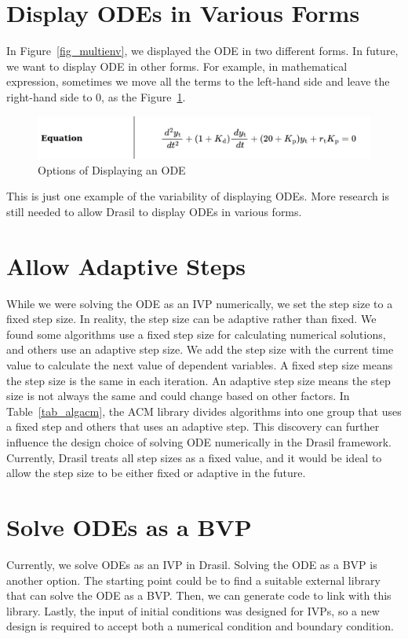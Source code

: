 \section{Display ODEs in Various Forms}
In Figure~\ref{fig_multienv}, we displayed the ODE in two different forms. In future, we want to display ODE in other forms. For example, in mathematical expression, sometimes we move all the terms to the left-hand side and leave the right-hand side to 0, as the Figure~\ref{fig_odevariousform}.
\begin{figure}[ht]
\centering	
\includegraphics[width=1\textwidth]{figures/ODEVariousForm.png}
\caption{Options of Displaying an ODE}
\label{fig_odevariousform}
\end{figure}
This is just one example of the variability of displaying ODEs. More research is still needed to allow Drasil to display ODEs in various forms.

\section{Allow Adaptive Steps}
While we were solving the ODE as an IVP numerically, we set the step size to a fixed step size. In reality, the step size can be adaptive rather than fixed. We found some algorithms use a fixed step size for calculating numerical solutions, and others use an adaptive step size. We add the step size with the current time value to calculate the next value of dependent variables. A fixed step size means the step size is the same in each iteration. An adaptive step size means the step size is not always the same and could change based on other factors. In Table~\ref{tab_algacm}, the ACM library divides algorithms into one group that uses a fixed step and others that uses an adaptive step. This discovery can further influence the design choice of solving ODE numerically in the Drasil framework. Currently, Drasil treats all step sizes as a fixed value, and it would be ideal to allow the step size to be either fixed or adaptive in the future.

\section{Solve ODEs as a BVP}
Currently, we solve ODEs as an IVP in Drasil. Solving the ODE as a BVP is another option. The starting point could be to find a suitable external library that can solve the ODE as a BVP. Then, we can generate code to link with this library. Lastly, the input of initial conditions was designed for IVPs, so a new design is required to accept both a numerical condition and boundary condition.

